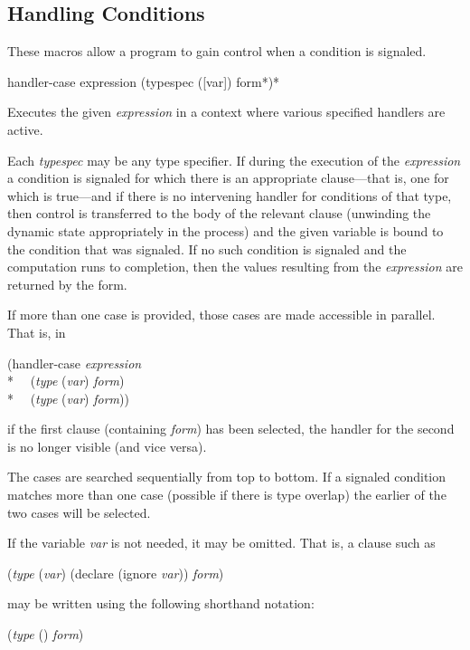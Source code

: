 \subsection{Handling Conditions}

These macros allow a program to gain control when a condition is signaled.

\begin{defmac}
handler-case expression {(typespec ([var]) {form}*)}*

Executes the given \emph{expression} in a context where various specified
handlers are active.

Each \emph{typespec} may be any type specifier. If during the execution of the
\emph{expression} a condition is signaled for which there is an appropriate
clause---that is, one for which 
is true---and if there is no intervening handler for conditions of that type,
then control is transferred to the body of the relevant clause (unwinding the
dynamic state appropriately in the process) and the given variable  is
bound to the condition that was signaled. If no such condition is signaled and
the computation runs to completion, then the values resulting from the
\emph{expression} are returned by the  form.

If more than one case is provided, those cases are made accessible in
parallel. That is, in
\begin{lisp}
(handler-case \emph{expression} \\*
~~(\emph{type} (\emph{var}) \emph{form}) \\*
~~(\emph{type} (\emph{var}) \emph{form}))
\end{lisp}
if the first clause (containing \emph{form}) has been selected, the
handler for the second is no longer visible (and vice versa).

The cases are searched sequentially from top to bottom. If a signaled condition
matches more than one case (possible if there is type overlap) the earlier of
the two cases will be selected.

If the variable \emph{var} is not needed, it may be omitted. That is, a clause
such as
\begin{lisp}
(\emph{type} (\emph{var}) (declare (ignore \emph{var})) \emph{form})
\end{lisp}
may be written using the following shorthand notation:
\begin{lisp}
(\emph{type} () \emph{form})
\end{lisp}


\end{defmac}
